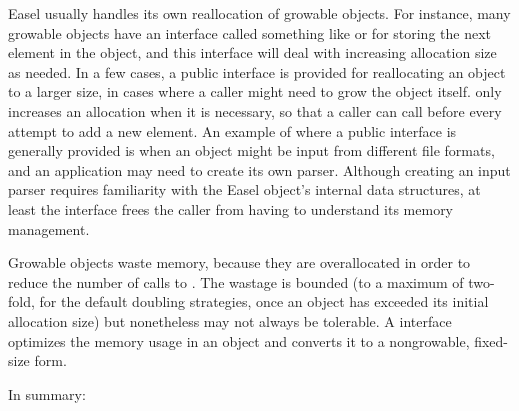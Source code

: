 Easel usually handles its own reallocation of growable objects. For
instance, many growable objects have an interface called something
like  or  for storing the next element
in the object, and this interface will deal with increasing allocation
size as needed.  In a few cases, a public  interface
is provided for reallocating an object to a larger size, in cases
where a caller might need to grow the object itself. 
only increases an allocation when it is necessary, so that a caller
can call  before every attempt to add a new
element. An example of where a public  interface is
generally provided is when an object might be input from different
file formats, and an application may need to create its own
parser. Although creating an input parser requires familiarity with
the Easel object's internal data structures, at least the
 interface frees the caller from having to understand
its memory management.

Growable objects waste memory, because they are overallocated in order
to reduce the number of calls to .  The wastage is
bounded (to a maximum of two-fold, for the default doubling
strategies, once an object has exceeded its initial allocation size)
but nonetheless may not always be tolerable.  A 
interface optimizes the memory usage in an object and converts it to a
nongrowable, fixed-size form. 

In summary: 

